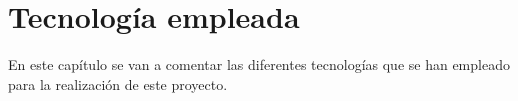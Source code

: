 \chapter{Tecnología empleada}
\noindent
En este capítulo se van a comentar las diferentes tecnologías que se han empleado para la realización de este proyecto.



